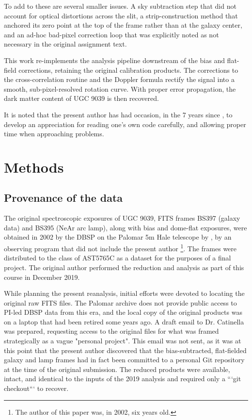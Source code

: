 \documentclass{aa}
\begin{document}
    To add to these are several smaller issues. A sky subtraction step that did not account for optical distortions across the slit, a strip-construction method that anchored its zero point at the top of the frame rather than at the galaxy center, and an ad-hoc bad-pixel correction loop that was explicitly noted as not necessary in the original assignment text.

    This work re-implements the analysis pipeline downstream of the bias and flat-field corrections, retaining the original calibration products. The corrections to the cross-correlation routine and the Doppler formula rectify the signal into a smooth, sub-pixel-resolved rotation curve. With proper error propagation, the dark matter content of UGC 9039 is then recovered.

    It is noted that the present author has had occasion, in the 7 years since \cite{fraustro}, to develop an appreciation for reading one's own code carefully, and allowing proper time when approaching problems.
    
\section{Methods}

    \subsection{Provenance of the data}\label{meth_provenance}

    The original spectroscopic exposures of UGC 9039, FITS frames BS397 (galaxy data) and BS395 (NeAr arc lamp), along with bias and dome-flat exposures, were obtained in 2002 by the DBSP on the Palomar 5m Hale telescope by \cite{catinella}, by an observing program that did not include the present author \footnote{The author of this paper was, in 2002, six years old.}. The frames were distributed to the class of AST5765C as a dataset for the purposes of a final project. The original author performed the reduction and analysis as part of this course in December 2019.

    While planning the present reanalysis, initial efforts were devoted to locating the original raw FITS files. The Palomar archive does not provide public access to PI-led DBSP data from this era, and the local copy of the original products was on a laptop that had been retired some years ago. A draft email to Dr. Catinella was prepared, requesting access to the original files for what was framed strategically as a vague "personal project". This email was not sent, as it was at this point that the present author discovered that the bias-subtracted, flat-fielded galaxy and lamp frames had in fact been committed to a personal Git repository at the time of the original submission. The reduced products were available, intact, and identical to the inputs of the 2019 analysis and required only a ```git checkout``` to recover.
\end{document}
